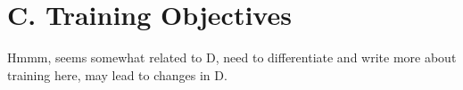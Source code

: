 \begin{comment}
\subsection{Obj 3 - compare simulation results to modern maize genomes, known to have undergone the same demographies simulated in objective 2}%
	compare to GWAS for maize/teo. do we recapitulate observations?
		several traits are genotyped/phenotyped in maize/teosinte
		If the estimated demographic model and DFE are reasonable, the genetic architecture of simulated phenotypes should closely mimic that of real data.
	are there differences between central and southern American pops? \jri{we have no GWAS data for S.Amer. pops, but do have genomes and GERP. we could get freq. etc. of del. mutations from sims and compare to GERP}
	
	Methods: same DoFE approach in C American maize pops for direct comparison
		in S American pops, can do comparison on subset, e.g. GERP, which we would have from Obj 1 if we compare to other approaches for the sort of validation of the DFE
			(definitely worth doing if b/c of 2nd bottleneck more deleterious stuff rose in frequency and was then eliminated)

	If the real data differ from simulation, we can explore the sensitivity of genetic architecture to changes to the demography or DFE; understanding this sensitivity will then lead to improved estimation of these important parameters.

\end{comment}	
	
	
	
	
	
	
	
	
	
	
	
	
	
	
\section*{C. Training Objectives}

Hmmm, seems somewhat related to D, need to differentiate and write more about training here, may lead to changes in D.


